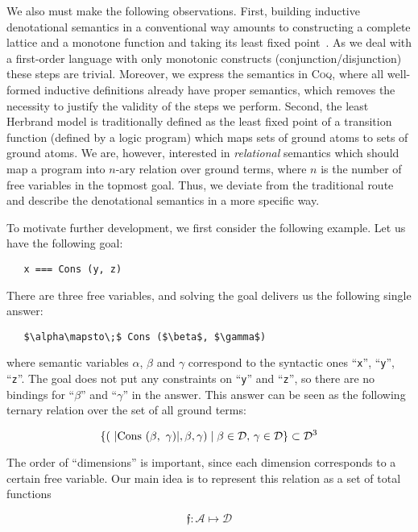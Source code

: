 We also must make the following observations. First, building inductive denotational semantics in a conventional way amounts to
constructing a complete lattice and a monotone function and taking its least fixed point~\cite{TarskiKnaster}.
As we deal with a first-order language with only monotonic constructs (conjunction/disjunction) these steps
are trivial. Moreover, we express the semantics in \textsc{Coq}, where all well-formed inductive definitions already
have proper semantics, which removes the necessity to justify the validity of the steps we perform. Second, 
the least Herbrand model is traditionally defined as the least fixed point of a transition function (defined by a logic program)
which maps sets of ground atoms to sets of ground atoms. We are, however, interested in \emph{relational} semantics which
should map a program into $n$-ary relation over ground terms, where $n$ is the number of free variables in the topmost
goal. Thus, we deviate from the traditional route and describe the denotational semantics in a more specific way.

To motivate further development, we first consider the following example. Let us have the following goal:

\begin{lstlisting}
   x === Cons (y, z)
\end{lstlisting}

There are three free variables, and solving the goal delivers us the following single answer:

\begin{lstlisting}
   $\alpha\mapsto\;$ Cons ($\beta$, $\gamma$)
\end{lstlisting}

where semantic variables $\alpha$, $\beta$ and $\gamma$ correspond to the syntactic ones ``\lstinline|x|'', ``\lstinline|y|'', ``\lstinline|z|''. The
goal does not put any constraints on ``\lstinline|y|'' and ``\lstinline|z|'', so there are no bindings for ``$\beta$'' and ``$\gamma$'' in the answer.
This answer can be seen as the following ternary relation over the set of all ground terms:

\[
\{(\mbox{\lstinline|Cons ($\beta$, $\,\gamma$)|}, \beta, \gamma) \mid \beta\in\mathcal{D},\,\gamma\in\mathcal{D}\}\subset\mathcal{D}^3
\]

The order of ``dimensions'' is important, since each dimension corresponds to a certain free variable. Our main idea is to represent this relation as a set of total
functions 

\[
\mathfrak{f}:\mathcal{A}\mapsto\mathcal{D}
\]

